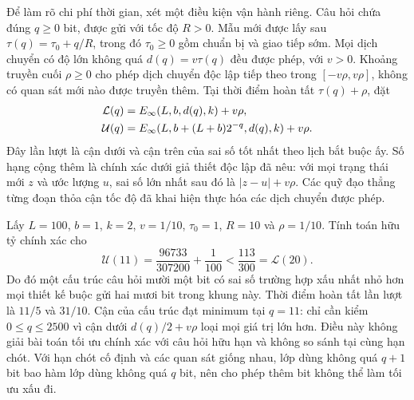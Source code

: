 Để làm rõ chi phí thời gian, xét một điều kiện vận hành riêng. Câu hỏi chứa đúng $q\geq0$ bit, được gửi với tốc độ $R>0$. Mẫu mới được lấy sau $\tau(q)=\tau_0+q/R$, trong đó $\tau_0\geq0$ gồm chuẩn bị và giao tiếp sớm. Mọi dịch chuyển có độ lớn không quá $d(q)=v\tau(q)$ đều được phép, với $v>0$. Khoảng truyền cuối $\rho\geq0$ cho phép dịch chuyển độc lập tiếp theo trong $[-v\rho,v\rho]$, không có quan sát mới nào được truyền thêm. Tại thời điểm hoàn tất $\tau(q)+\rho$, đặt
\begin{align}\label{B-eq:timing}
\mathcal L(q)&=E_{\infty}(L,b,d(q),k)+v\rho,\notag\\
\mathcal U(q)&=E_{\infty}(L,b+(L+b)2^{-q},d(q),k)+v\rho.
\end{align}
Đây lần lượt là cận dưới và cận trên của sai số tốt nhất theo lịch bắt buộc ấy. Số hạng cộng thêm là chính xác dưới giả thiết độc lập đã nêu: với mọi trạng thái mới $z$ và ước lượng $u$, sai số lớn nhất sau đó là $|z-u|+v\rho$. Các quỹ đạo thẳng từng đoạn thỏa cận tốc độ đã khai hiện thực hóa các dịch chuyển được phép.

Lấy $L=100$, $b=1$, $k=2$, $v=1/10$, $\tau_0=1$, $R=10$ và $\rho=1/10$. Tính toán hữu tỷ chính xác cho
\begin{equation}\label{B-eq:example}
\mathcal U(11)=\frac{96733}{307200}+\frac1{100}<\frac{113}{300}=\mathcal L(20).
\end{equation}
Do đó một cấu trúc câu hỏi mười một bit có sai số trường hợp xấu nhất nhỏ hơn mọi thiết kế buộc gửi hai mươi bit trong khung này. Thời điểm hoàn tất lần lượt là $11/5$ và $31/10$. Cận của cấu trúc đạt minimum tại $q=11$: chỉ cần kiểm $0\leq q\leq2500$ vì cận dưới $d(q)/2+v\rho$ loại mọi giá trị lớn hơn. Điều này không giải bài toán tối ưu chính xác với câu hỏi hữu hạn và không so sánh tại cùng hạn chót. Với hạn chót cố định và các quan sát giống nhau, lớp dùng không quá $q+1$ bit bao hàm lớp dùng không quá $q$ bit, nên cho phép thêm bit không thể làm tối ưu xấu đi.

